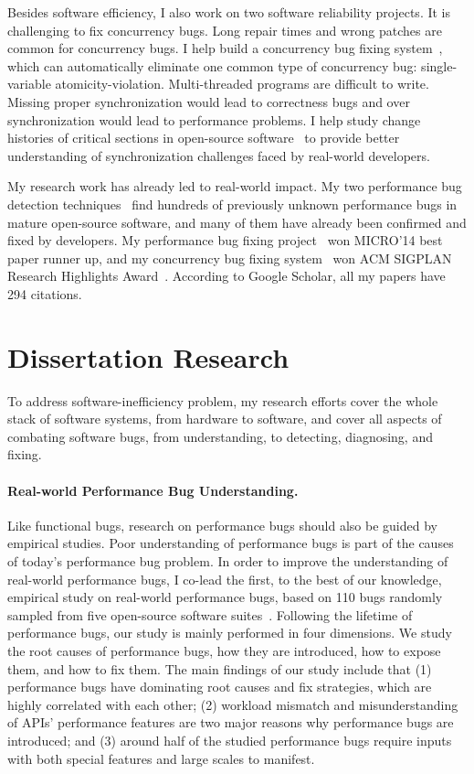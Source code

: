 \documentclass[10pt]{article}
\begin{document}
Besides software efficiency, I also work on two software reliability projects. 
It is challenging to fix concurrency bugs. 
Long repair times and wrong patches
are common for concurrency bugs.
I help build a concurrency bug fixing system~\cite{jin11afix}, 
which can automatically eliminate one common type of concurrency bug: single-variable atomicity-violation.
Multi-threaded programs are difficult to write.
Missing proper synchronization would lead to correctness bugs 
and over synchronization would lead to performance problems. 
I help study change histories of critical sections in open-source software~\cite{Gu15FSE} 
to provide better understanding of synchronization challenges faced by real-world developers.

My research work has already led to real-world impact. 
My two performance bug detection techniques~\cite{jin12perfbug, Nistor13ICSE} find hundreds of previously unknown performance bugs in mature open-source software, 
and many of them have already been confirmed and fixed by developers. 
My performance bug fixing project~\cite{Song14MICRO} won MICRO'14 best paper runner up, 
and my concurrency bug fixing system~\cite{jin11afix} won ACM SIGPLAN Research Highlights Award~\cite{afixnom}. 
According to Google Scholar, all my papers have 294 citations. 


\section{Dissertation Research}

To address software-inefficiency problem, my research efforts cover the whole stack of software systems, from hardware to software, 
and cover all aspects of combating software bugs, from understanding, to detecting, diagnosing, and fixing. 

\paragraph{Real-world Performance Bug Understanding.}
Like functional bugs, research on performance bugs should also be guided by empirical studies. 
Poor understanding of performance bugs is part of the causes of today's performance bug problem. 
In order to improve the understanding of real-world performance bugs, 
I co-lead the first, to the best of our knowledge, 
empirical study on real-world performance bugs, based on 110 bugs randomly sampled from five open-source software suites~\cite{jin12perfbug}. 
Following the lifetime of performance bugs, 
our study is mainly performed in four dimensions. 
We study the root causes of performance bugs, 
how they are introduced, how to expose them, and how to fix them. 
The main findings of our study include that 
(1) performance bugs have dominating root causes and fix strategies, which are highly correlated with each other; 
(2) workload mismatch and misunderstanding of APIs' performance features are two major reasons why performance bugs are introduced; 
and (3) around half of the studied performance bugs require inputs with both special features and large scales to manifest. 
\end{document}
